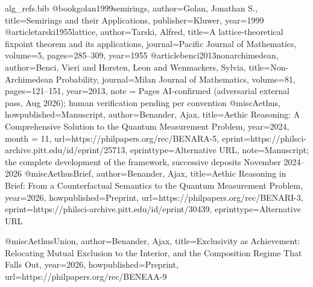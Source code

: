 \begin{filecontents}[overwrite]{alg_refs.bib}
@book{golan1999semirings, author={Golan, Jonathan S.}, title={Semirings and their Applications}, publisher={Kluwer}, year={1999}}
@article{tarski1955lattice, author={Tarski, Alfred}, title={A lattice-theoretical fixpoint theorem and its applications}, journal={Pacific Journal of Mathematics}, volume={5}, pages={285--309}, year={1955}}
@article{benci2013nonarchimedean, author={Benci, Vieri and Horsten, Leon and Wenmackers, Sylvia}, title={Non-Archimedean Probability}, journal={Milan Journal of Mathematics}, volume={81}, pages={121--151}, year={2013}, note = {Pages AI-confirmed (adversarial external pass, Aug 2026); human verification pending per convention}}
@misc{Aethus, howpublished={Manuscript}, author={Benander, Ajax}, title={Aethic Reasoning: A Comprehensive Solution to the Quantum Measurement Problem}, year={2024}, month = {11}, url={https://philpapers.org/rec/BENARA-5}, eprint={https://philsci-archive.pitt.edu/id/eprint/25713}, eprinttype={Alternative URL}, note={Manuscript; the complete development of the framework, successive deposits November 2024--2026}}
@misc{AethusBrief, author={Benander, Ajax}, title={Aethic Reasoning in Brief: From a Counterfactual Semantics to the Quantum Measurement Problem}, year={2026}, howpublished={Preprint}, url={https://philpapers.org/rec/BENARI-3}, eprint={https://philsci-archive.pitt.edu/id/eprint/30439}, eprinttype={Alternative URL}}

@misc{AethusUnion, author={Benander, Ajax}, title={Exclusivity as Achievement: Relocating Mutual Exclusion to the Interior, and the Composition Regime That Falls Out}, year={2026}, howpublished={Preprint}, url={https://philpapers.org/rec/BENEAA-9}}




\end{filecontents}
